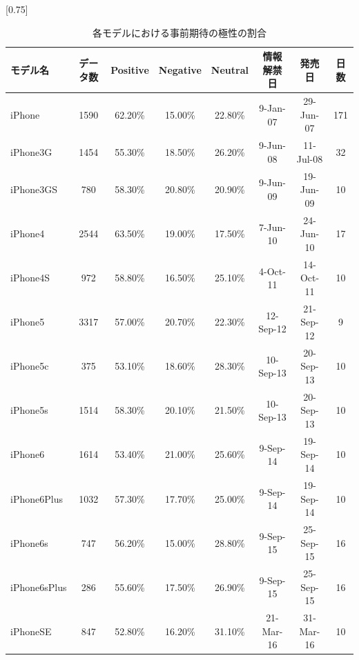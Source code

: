 \documentclass[uplatex,11pt]{jsarticle}
\begin{document}
\begin{table}
    \begin{center}
        \small
        \caption{各モデルにおける事前期待の極性の割合}
        \scalebox{0.9}[0.75]{
            \begin{tabular}{|l|ccccccc|}
                \hline
                モデル名      & データ数  & Positive & Negative & Neutral & 情報解禁日 & 発売日 & 日数\\ \hline
                iPhone       & 1590     & 62.20\%        & 15.00\%        & 22.80\%       & 9-Jan-07  & 29-Jun-07 & 171    \\
                iPhone3G     & 1454     & 55.30\%        & 18.50\%        & 26.20\%       & 9-Jun-08  & 11-Jul-08 & 32     \\
                iPhone3GS    & 780      & 58.30\%        & 20.80\%        & 20.90\%       & 9-Jun-09  & 19-Jun-09 & 10     \\
                iPhone4      & 2544     & 63.50\%        & 19.00\%        & 17.50\%       & 7-Jun-10  & 24-Jun-10 & 17     \\
                iPhone4S     & 972      & 58.80\%        & 16.50\%        & 25.10\%       & 4-Oct-11  & 14-Oct-11 & 10     \\
                iPhone5      & 3317     & 57.00\%        & 20.70\%        & 22.30\%       & 12-Sep-12 & 21-Sep-12 & 9      \\
                iPhone5c     & 375      & 53.10\%        & 18.60\%        & 28.30\%       & 10-Sep-13 & 20-Sep-13 & 10     \\
                iPhone5s     & 1514     & 58.30\%        & 20.10\%        & 21.50\%       & 10-Sep-13 & 20-Sep-13 & 10     \\
                iPhone6      & 1614     & 53.40\%        & 21.00\%        & 25.60\%       & 9-Sep-14  & 19-Sep-14 & 10     \\
                iPhone6Plus  & 1032     & 57.30\%        & 17.70\%        & 25.00\%       & 9-Sep-14  & 19-Sep-14 & 10     \\
                iPhone6s     & 747      & 56.20\%        & 15.00\%        & 28.80\%       & 9-Sep-15  & 25-Sep-15 & 16     \\
                iPhone6sPlus & 286      & 55.60\%        & 17.50\%        & 26.90\%       & 9-Sep-15  & 25-Sep-15 & 16     \\
                iPhoneSE     & 847      & 52.80\%        & 16.20\%        & 31.10\%       & 21-Mar-16 & 31-Mar-16 & 10     \\

\end{tabular}}
\end{center}
\end{table}
\end{document}
